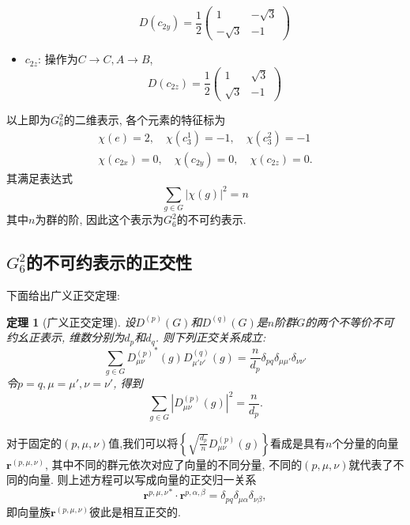 \documentclass[UTF8]{ctexart}
\newtheorem{thm}{定理}
\begin{document}
\begin{itemize}
  \begin{equation}
    D(c_{2y}) = \frac{1}{2}
    \begin{pmatrix}
      1 & -\sqrt{3} \\
      -\sqrt{3} & -1
    \end{pmatrix}
  \end{equation}
\item $c_{2z}$: 操作为$C \rightarrow C, A \rightarrow B$, 
  \begin{equation}
    D(c_{2z}) = \frac{1}{2}
    \begin{pmatrix}
      1 & \sqrt{3} \\
      \sqrt{3} & -1
    \end{pmatrix}
  \end{equation}
\end{itemize}

以上即为$G_6^2$的二维表示, 各个元素的特征标为
\begin{gather}
  \chi (e) = 2, \quad \chi (c_3^1) = -1, \quad \chi (c_3^2) = -1 \\
  \chi (c_{2x}) = 0, \quad \chi (c_{2y}) = 0, \quad \chi (c_{2z}) = 0.
\end{gather}
其满足表达式
\begin{equation}
  \sum_{g\in G} |\chi (g)|^2 = n
\end{equation}
其中$n$为群的阶, 因此这个表示为$G_6^2$的不可约表示.

\subsection{$G_6^2$的不可约表示的正交性}
下面给出广义正交定理:
\begin{thm}[广义正交定理]
  设$D^{(p)} (G)$和$D^{(q)} (G)$是$n$阶群$G$的两个不等价不可约幺正表示, 维数分别为$d_p$和$d_q$. 则下列正交关系成立:
  \begin{equation}
    \sum_{g\in G} {D_{\mu \nu}^{(p)}}^{*}(g) D_{\mu' \nu'}^{(q)} (g) = \frac{n}{d_p} \delta_{pq} \delta_{\mu \mu'} \delta_{\nu \nu'}
  \end{equation}
令$p = q, \mu = \mu', \nu = \nu'$, 得到
\begin{equation}
  \sum_{g\in G} |D_{\mu \nu}^{(p)} (g)|^2 = \frac{n}{d_p}.
\end{equation}
\end{thm}

对于固定的$(p,\mu,\nu)$值,我们可以将$\left\{ \sqrt{\frac{d_p}{n}} D_{\mu \nu}^{(p)} (g)\right\}$看成是具有$n$个分量的向量$\bm{r}^{(p,\mu,\nu)}$, 其中不同的群元依次对应了向量的不同分量, 不同的$(p, \mu, \nu)$就代表了不同的向量. 则上述方程可以写成向量的正交归一关系
\begin{equation}
  {\bm{r}^{p,\mu,\nu}}^{*} \cdot \bm{r}^{p,\alpha,\beta} = \delta_{pq} \delta_{\mu \alpha} \delta_{\nu \beta},
\end{equation}
即向量族$\bm{r}^{(p,\mu,\nu)}$彼此是相互正交的.
\end{document}
